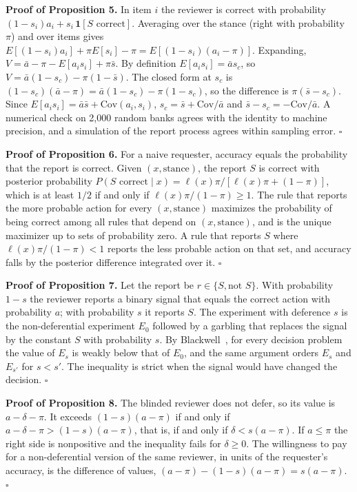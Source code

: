 \documentclass[10pt,a4paper]{article}
\begin{document}
\medskip\noindent\textbf{Proof of Proposition 5.} In item $i$ the reviewer is correct with probability $(1-s_i)a_i+s_i\,\mathbf 1[S\text{ correct}]$. Averaging over the stance (right with probability $\pi$) and over items gives $E[(1-s_i)a_i]+\pi E[s_i]-\pi=E[(1-s_i)(a_i-\pi)]$. Expanding, $V=\bar a-\pi-E[a_is_i]+\pi\bar s$. By definition $E[a_is_i]=\bar a s_c$, so $V=\bar a(1-s_c)-\pi(1-\bar s)$. The closed form at $s_c$ is $(1-s_c)(\bar a-\pi)=\bar a(1-s_c)-\pi(1-s_c)$, so the difference is $\pi(\bar s-s_c)$. Since $E[a_is_i]=\bar a\bar s+\mathrm{Cov}(a_i,s_i)$, $s_c=\bar s+\mathrm{Cov}/\bar a$ and $\bar s-s_c=-\mathrm{Cov}/\bar a$. A numerical check on 2{,}000 random banks agrees with the identity to machine precision, and a simulation of the report process agrees within sampling error. \hfill$\square$

\medskip\noindent\textbf{Proof of Proposition 6.} For a naive requester, accuracy equals the probability that the report is correct. Given $(x,\text{stance})$, the report $S$ is correct with posterior probability $P(S\text{ correct}\mid x)=\ell(x)\pi/[\ell(x)\pi+(1-\pi)]$, which is at least $1/2$ if and only if $\ell(x)\pi/(1-\pi)\ge1$. The rule that reports the more probable action for every $(x,\text{stance})$ maximizes the probability of being correct among all rules that depend on $(x,\text{stance})$, and is the unique maximizer up to sets of probability zero. A rule that reports $S$ where $\ell(x)\pi/(1-\pi)<1$ reports the less probable action on that set, and accuracy falls by the posterior difference integrated over it. \hfill$\square$

\medskip\noindent\textbf{Proof of Proposition 7.} Let the report be $r\in\{S,\text{not }S\}$. With probability $1-s$ the reviewer reports a binary signal that equals the correct action with probability $a$; with probability $s$ it reports $S$. The experiment with deference $s$ is the non-deferential experiment $E_0$ followed by a garbling that replaces the signal by the constant $S$ with probability $s$. By Blackwell~\cite{blackwell1953equivalent}, for every decision problem the value of $E_s$ is weakly below that of $E_0$, and the same argument orders $E_s$ and $E_{s'}$ for $s<s'$. The inequality is strict when the signal would have changed the decision. \hfill$\square$

\medskip\noindent\textbf{Proof of Proposition 8.} The blinded reviewer does not defer, so its value is $a-\delta-\pi$. It exceeds $(1-s)(a-\pi)$ if and only if $a-\delta-\pi>(1-s)(a-\pi)$, that is, if and only if $\delta<s(a-\pi)$. If $a\le\pi$ the right side is nonpositive and the inequality fails for $\delta\ge0$. The willingness to pay for a non-deferential version of the same reviewer, in units of the requester's accuracy, is the difference of values, $(a-\pi)-(1-s)(a-\pi)=s(a-\pi)$. \hfill$\square$
\end{document}
